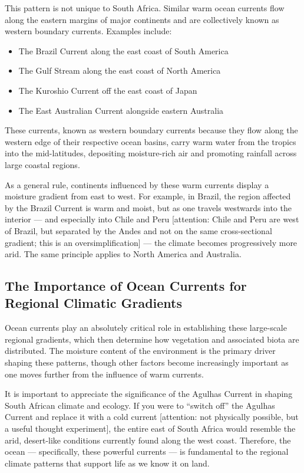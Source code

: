 \documentclass[
  12pt,
]{book}
\providecommand{\tightlist}{%
  \setlength{\itemsep}{0pt}\setlength{\parskip}{0pt}}
\begin{document}
This pattern is not unique to South Africa. Similar warm ocean currents
flow along the eastern margins of major continents and are collectively
known as western boundary currents. Examples include:

\begin{itemize}
\tightlist
\item
  The Brazil Current along the east coast of South America
\item
  The Gulf Stream along the east coast of North America
\item
  The Kuroshio Current off the east coast of Japan
\item
  The East Australian Current alongside eastern Australia
\end{itemize}

These currents, known as western boundary currents because they flow
along the western edge of their respective ocean basins, carry warm
water from the tropics into the mid-latitudes, depositing moisture-rich
air and promoting rainfall across large coastal regions.

As a general rule, continents influenced by these warm currents display
a moisture gradient from east to west. For example, in Brazil, the
region affected by the Brazil Current is warm and moist, but as one
travels westwards into the interior --- and especially into Chile and
Peru {[}attention: Chile and Peru are west of Brazil, but separated by
the Andes and not on the same cross-sectional gradient; this is an
oversimplification{]} --- the climate becomes progressively more arid.
The same principle applies to North America and Australia.

\subsection{The Importance of Ocean Currents for Regional Climatic
Gradients}\label{the-importance-of-ocean-currents-for-regional-climatic-gradients}

Ocean currents play an absolutely critical role in establishing these
large-scale regional gradients, which then determine how vegetation and
associated biota are distributed. The moisture content of the
environment is the primary driver shaping these patterns, though other
factors become increasingly important as one moves further from the
influence of warm currents.

It is important to appreciate the significance of the Agulhas Current in
shaping South African climate and ecology. If you were to ``switch off''
the Agulhas Current and replace it with a cold current {[}attention: not
physically possible, but a useful thought experiment{]}, the entire east
of South Africa would resemble the arid, desert-like conditions
currently found along the west coast. Therefore, the ocean ---
specifically, these powerful currents --- is fundamental to the regional
climate patterns that support life as we know it on land.
\end{document}
